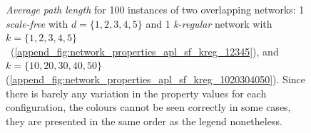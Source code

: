 \begin{figure}[H]
\begin{minipage}{0.9\linewidth}
\vspace{0.2cm}
\caption{\textit{Average path length} for 100 instances of two overlapping networks: 1 \textit{scale-free} with $d=\{1,2,3,4,5\}$ and 1 \textit{k-regular} network with ~$k=\{1,2,3,4,5\}$~(\ref{append_fig:network_properties_apl_sf_kreg_12345}), and  $k=\{10,20,30,40,50\}$ (\ref{append_fig:network_properties_apl_sf_kreg_1020304050}). Since there is barely any variation in the property values for each configuration, the colours cannot be seen correctly in some cases, they are presented in the same order as the legend nonetheless.}
\label{append_fig:network_properties_apl_sf_kreg}
\end{minipage}

\end{figure}

